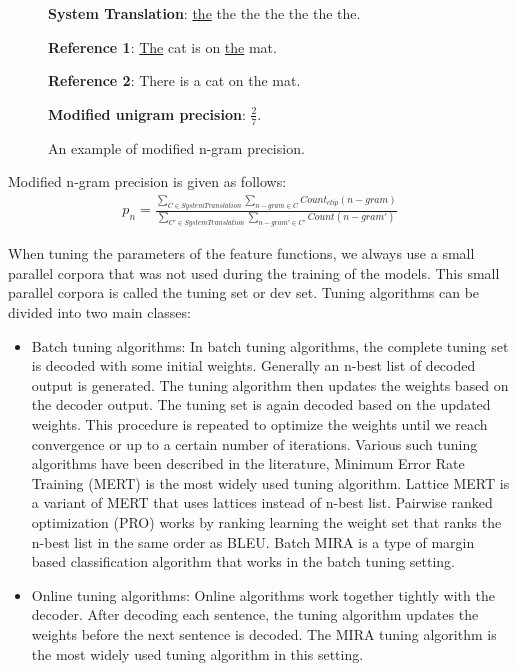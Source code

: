 \begin{figure}[htp]
	\centering
	\begin{boxedminipage}{25em}
		\textbf{System Translation}: \underline{the} the the the the the the.
		
		\textbf{Reference 1}: \underline{The} cat is on \underline{the} mat.
		
		\textbf{Reference 2}: There is a cat on the mat.
		
		\textbf{Modified unigram precision}: $\frac{2}{7}$.
	\end{boxedminipage}
	\caption{An example of modified n-gram precision.}
	\label{example:bad-bleu-example}
\end{figure}

Modified n-gram precision is given as follows:
\begin{eqnarray}
	p_n = \frac{\sum_{C \in SystemTranslation} \sum_{n-gram \in C} Count_{clip}(n-gram)}{\sum_{C\prime \in SystemTranslation} \sum_{n-gram\prime \in C\prime} Count(n-gram\prime)}
\end{eqnarray}

When tuning the parameters of the feature functions, we always use a small parallel corpora that was not used during the training of the models. This small parallel corpora is called the tuning set or dev set. Tuning algorithms can be divided into two main classes:
\begin{itemize}
	\item Batch tuning algorithms: In batch tuning algorithms, the complete tuning set is decoded with some initial weights. Generally an n-best list of decoded output is generated. The tuning algorithm then updates the weights based on the decoder output. The tuning set is again decoded based on the updated weights. This procedure is repeated to optimize the weights until we reach convergence or up to a certain number of iterations. Various such tuning algorithms have been described in the literature, Minimum Error Rate Training (MERT) \cite{Och2003} is the most widely used tuning algorithm. Lattice MERT \cite{Macherey2008} is a variant of MERT that uses lattices instead of n-best list. Pairwise ranked optimization (PRO) \cite{Hopkins2011} works by ranking learning the weight set that ranks the n-best list in the same order as BLEU. Batch MIRA \cite{Cherry2012} is a type of margin based classification algorithm that works in the batch tuning setting.
	\item Online tuning algorithms: Online algorithms work together tightly with the decoder. After decoding each sentence, the tuning algorithm updates the weights before the next sentence is decoded. The MIRA tuning algorithm \cite{Cherry2012} is the most widely used tuning algorithm in this setting.
\end{itemize}

